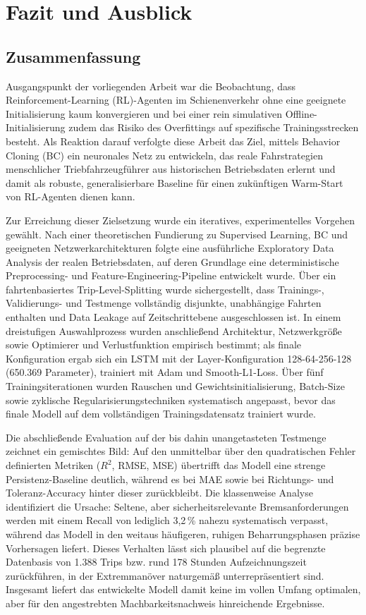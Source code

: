 \section{Fazit und Ausblick}

\subsection{Zusammenfassung}

Ausgangspunkt der vorliegenden Arbeit war die Beobachtung, dass Reinforcement-Learning (RL)-Agenten im Schienenverkehr ohne eine geeignete Initialisierung kaum konvergieren und bei einer rein simulativen Offline-Initialisierung zudem das Risiko des Overfittings auf spezifische Trainingsstrecken besteht. Als Reaktion darauf verfolgte diese Arbeit das Ziel, mittels Behavior Cloning (BC) ein neuronales Netz zu entwickeln, das reale Fahrstrategien menschlicher Triebfahrzeugführer aus historischen Betriebsdaten erlernt und damit als robuste, generalisierbare Baseline für einen zukünftigen Warm-Start von RL-Agenten dienen kann.

Zur Erreichung dieser Zielsetzung wurde ein iteratives, experimentelles Vorgehen gewählt. Nach einer theoretischen Fundierung zu Supervised Learning, BC und geeigneten Netzwerkarchitekturen folgte eine ausführliche Exploratory Data Analysis der realen Betriebsdaten, auf deren Grundlage eine deterministische Preprocessing- und Feature-Engineering-Pipeline entwickelt wurde. Über ein fahrtenbasiertes Trip-Level-Splitting wurde sichergestellt, dass Trainings-, Validierungs- und Testmenge vollständig disjunkte, unabhängige Fahrten enthalten und Data Leakage auf Zeitschrittebene ausgeschlossen ist. In einem dreistufigen Auswahlprozess wurden anschließend Architektur, Netzwerkgröße sowie Optimierer und Verlustfunktion empirisch bestimmt; als finale Konfiguration ergab sich ein LSTM mit der Layer-Konfiguration 128-64-256-128 (650.369 Parameter), trainiert mit Adam und Smooth-L1-Loss. Über fünf Trainingsiterationen wurden Rauschen und Gewichtsinitialisierung, Batch-Size sowie zyklische Regularisierungstechniken systematisch angepasst, bevor das finale Modell auf dem vollständigen Trainingsdatensatz trainiert wurde.

Die abschließende Evaluation auf der bis dahin unangetasteten Testmenge zeichnet ein gemischtes Bild: Auf den unmittelbar über den quadratischen Fehler definierten Metriken ($R^2$, RMSE, MSE) übertrifft das Modell eine strenge Persistenz-Baseline deutlich, während es bei MAE sowie bei Richtungs- und Toleranz-Accuracy hinter dieser zurückbleibt. Die klassenweise Analyse identifiziert die Ursache: Seltene, aber sicherheitsrelevante Bremsanforderungen werden mit einem Recall von lediglich 3,2\,\% nahezu systematisch verpasst, während das Modell in den weitaus häufigeren, ruhigen Beharrungsphasen präzise Vorhersagen liefert. Dieses Verhalten lässt sich plausibel auf die begrenzte Datenbasis von 1.388 Trips bzw. rund 178 Stunden Aufzeichnungszeit zurückführen, in der Extremmanöver naturgemäß unterrepräsentiert sind. Insgesamt liefert das entwickelte Modell damit keine im vollen Umfang optimalen, aber für den angestrebten Machbarkeitsnachweis hinreichende Ergebnisse.

